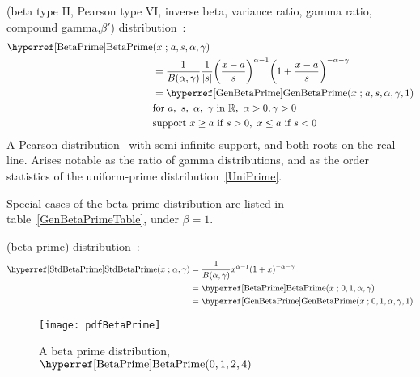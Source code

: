 

\label{sec:BetaPrime}



 (beta type II, Pearson type VI, inverse beta, variance ratio, gamma ratio, compound gamma,$\beta'$) distribution~\cite{Pearson1901,Johnson1995}:
\begin{align}
\label{BetaPrime}
\opr{BetaPrime}&(x\given  a, s,\alpha, \gamma) \\ \notag&= \frac{1}{B(\alpha,\gamma)}\frac{1}{|s|} \Left(\frac{x-a}{s}\Right)^{\alpha -1} \Left(1+\frac{x-a}{s}\Right)^{-\alpha-\gamma }  \checked
\\
&= \opr{GenBetaPrime}(x\given a,s, \alpha,\gamma,1) \notag \checked
\\
& \text{for }  a,\ s,\ \alpha,\ \gamma \text{ in } \Real, \  \alpha>0, \gamma>0  \checked
\notag \\ 
& \text{support } x \geq a \ \text{if}\ s > 0,  \ x\leq a  \ \text{if}\  s < 0 
\notag
\end{align}
A Pearson distribution~ with semi-infinite support, and both roots on the real line. Arises notable as the ratio of gamma distributions, and as the order statistics of the uniform-prime distribution~\eqref{UniPrime}.



Special cases of the beta prime distribution are listed in table~\ref{GenBetaPrimeTable}, under $\beta=1$.


 (beta prime) distribution~\cite{Pearson1901}:
\begin{align}
\label{StdBetaPrime}
\opr{StdBetaPrime}(x\given \alpha, \gamma) &= \frac{1}{B(\alpha,\gamma)} x^{\alpha -1} (1+x )^{-\alpha-\gamma } \checked
\\&= \opr{BetaPrime}(x\given  0,1, \alpha,\gamma) \notag	\checked
\\&= \opr{GenBetaPrime}(x\given  0,1, \alpha,\gamma,1) \notag \checked
\end{align}


\begin{figure}[tp!]
\begin{center}
\texttt{[image: pdfBetaPrime]}
\end{center}
\caption[Beta prime distribution]{A beta prime distribution, $\opr{BetaPrime}(0, 1, 2, 4)$}
\end{figure}


